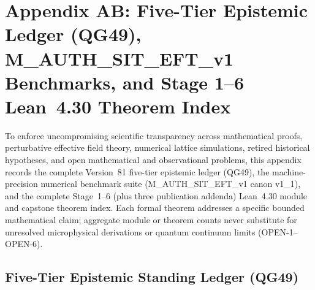 \documentclass[american,11pt,letterpaper]{article}
\def\texttt#1{#1}%
\begin{document}
\section*{Appendix AB: Five-Tier Epistemic Ledger (\texttt{QG49}), \texttt{M\_AUTH\_SIT\_EFT\_v1} Benchmarks, and Stage 1--6 Lean~4.30 Theorem Index}
\label{app:epistemic-ledger-lean}

To enforce uncompromising scientific transparency across mathematical proofs, perturbative effective field theory, numerical lattice simulations, retired historical hypotheses, and open mathematical and observational problems, this appendix records the complete Version~81 five-tier epistemic ledger (\texttt{QG49}), the machine-precision numerical benchmark suite (\texttt{M\_AUTH\_SIT\_EFT\_v1} canon \texttt{v1\_1}), and the complete Stage~1--6 (plus three publication addenda) Lean~4.30 module and capstone theorem index. Each formal theorem addresses a specific bounded mathematical claim; aggregate module or theorem counts never substitute for unresolved microphysical derivations or quantum continuum limits (\texttt{OPEN-1}--\texttt{OPEN-6}).

\subsection{Five-Tier Epistemic Standing Ledger (\texttt{QG49})}
\end{document}
